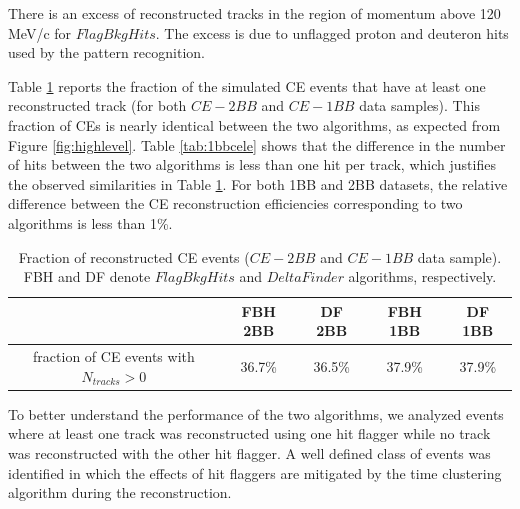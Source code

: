 There is an excess of reconstructed tracks in the region of momentum above 120 MeV/c 
for $FlagBkgHits$. 
The excess is due to unflagged proton and deuteron hits used by the pattern recognition.

Table \ref{tab:recoeffcele} reports 
the fraction of the simulated CE events that have at least one 
reconstructed track (for both 
$CE-2BB$ and $CE-1BB$ data samples). 
This fraction of CEs is nearly identical 
between the two algorithms, 
as expected from Figure \ref{fig:highlevel}.
Table \ref{tab:1bbcele} shows 
that the difference in the number of 
hits between the two algorithms 
is less than one hit per track, which 
justifies the observed similarities in 
Table \ref{tab:recoeffcele}.
For both 1BB and 2BB datasets, the relative difference between the 
CE reconstruction efficiencies corresponding to two algorithms is less than 1\%.



\begin{center}
    \begin{table}[h!]
    \centering
    \renewcommand{\arraystretch}{1.}
    \begin{tabular}{| c | c | c | c | c |} 
    \hline
    & FBH 2BB & DF 2BB & FBH 1BB & DF 1BB  \\
    \hline
    fraction of CE events with $N_{tracks}>0$ & 36.7\% & 36.5\% & 37.9\% & 37.9\%\\
    \hline
    \end{tabular}
    \caption{Fraction of reconstructed CE events ($CE-2BB$ and $CE-1BB$ data sample). FBH and DF denote  
    $FlagBkgHits$ and $DeltaFinder$ algorithms, respectively.}
    \label{tab:recoeffcele}
\end{table}
\end{center}

To better understand the performance of the 
two algorithms, we analyzed events where at least one 
track was reconstructed using one hit flagger while no track  
was reconstructed with the other hit flagger. A well defined class 
of events was identified in which the effects of hit flaggers are 
mitigated by the time clustering algorithm during the reconstruction.

